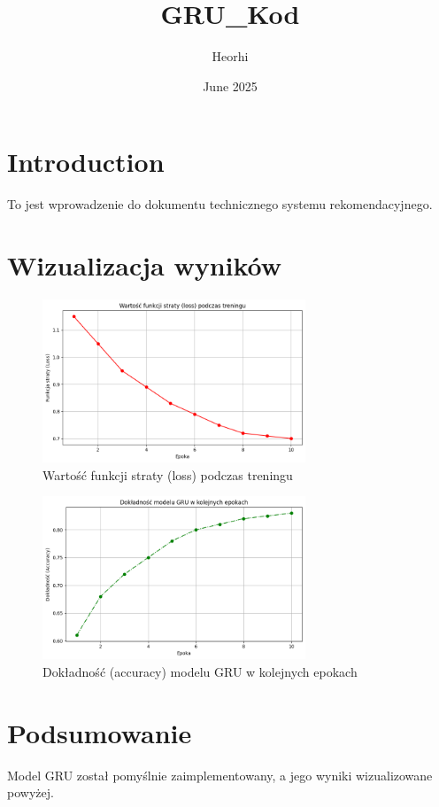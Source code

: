 \documentclass{article}
\title{GRU\_Kod}
\author{Heorhi}
\date{June 2025}
\begin{document}
\maketitle

\section{Introduction}
To jest wprowadzenie do dokumentu technicznego systemu rekomendacyjnego.

\section{Wizualizacja wyników}

\begin{figure}[h]
\centering
\includegraphics[width=0.7\textwidth]{loss_plot.png}
\caption{Wartość funkcji straty (loss) podczas treningu}
\end{figure}

\begin{figure}[h]
\centering
\includegraphics[width=0.7\textwidth]{accuracy_plot.png}
\caption{Dokładność (accuracy) modelu GRU w kolejnych epokach}
\end{figure}

\section{Podsumowanie}
Model GRU został pomyślnie zaimplementowany, a jego wyniki wizualizowane powyżej.
\end{document}
